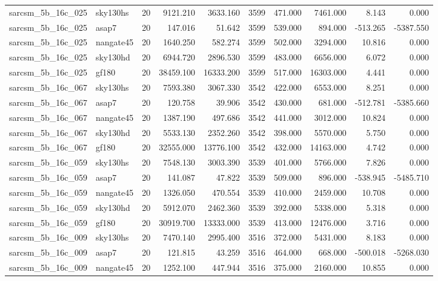 \begin{tabular}{llrrrrrrrr}
sarcsm\_5b\_16c\_025 & sky130hs & 20 & 9121.210 & 3633.160 & 3599 & 471.000 & 7461.000 & 8.143 & 0.000 \\
sarcsm\_5b\_16c\_025 & asap7 & 20 & 147.016 & 51.642 & 3599 & 539.000 & 894.000 & -513.265 & -5387.550 \\
sarcsm\_5b\_16c\_025 & nangate45 & 20 & 1640.250 & 582.274 & 3599 & 502.000 & 3294.000 & 10.816 & 0.000 \\
sarcsm\_5b\_16c\_025 & sky130hd & 20 & 6944.720 & 2896.530 & 3599 & 483.000 & 6656.000 & 6.072 & 0.000 \\
sarcsm\_5b\_16c\_025 & gf180 & 20 & 38459.100 & 16333.200 & 3599 & 517.000 & 16303.000 & 4.441 & 0.000 \\
sarcsm\_5b\_16c\_067 & sky130hs & 20 & 7593.380 & 3067.330 & 3542 & 422.000 & 6553.000 & 8.251 & 0.000 \\
sarcsm\_5b\_16c\_067 & asap7 & 20 & 120.758 & 39.906 & 3542 & 430.000 & 681.000 & -512.781 & -5385.660 \\
sarcsm\_5b\_16c\_067 & nangate45 & 20 & 1387.190 & 497.686 & 3542 & 441.000 & 3012.000 & 10.824 & 0.000 \\
sarcsm\_5b\_16c\_067 & sky130hd & 20 & 5533.130 & 2352.260 & 3542 & 398.000 & 5570.000 & 5.750 & 0.000 \\
sarcsm\_5b\_16c\_067 & gf180 & 20 & 32555.000 & 13776.100 & 3542 & 432.000 & 14163.000 & 4.742 & 0.000 \\
sarcsm\_5b\_16c\_059 & sky130hs & 20 & 7548.130 & 3003.390 & 3539 & 401.000 & 5766.000 & 7.826 & 0.000 \\
sarcsm\_5b\_16c\_059 & asap7 & 20 & 141.087 & 47.822 & 3539 & 509.000 & 896.000 & -538.945 & -5485.710 \\
sarcsm\_5b\_16c\_059 & nangate45 & 20 & 1326.050 & 470.554 & 3539 & 410.000 & 2459.000 & 10.708 & 0.000 \\
sarcsm\_5b\_16c\_059 & sky130hd & 20 & 5912.070 & 2462.360 & 3539 & 392.000 & 5338.000 & 5.318 & 0.000 \\
sarcsm\_5b\_16c\_059 & gf180 & 20 & 30919.700 & 13333.000 & 3539 & 413.000 & 12476.000 & 3.716 & 0.000 \\
sarcsm\_5b\_16c\_009 & sky130hs & 20 & 7470.140 & 2995.400 & 3516 & 372.000 & 5431.000 & 8.183 & 0.000 \\
sarcsm\_5b\_16c\_009 & asap7 & 20 & 121.815 & 43.259 & 3516 & 464.000 & 668.000 & -500.018 & -5268.030 \\
sarcsm\_5b\_16c\_009 & nangate45 & 20 & 1252.100 & 447.944 & 3516 & 375.000 & 2160.000 & 10.855 & 0.000 \\

\end{tabular}
